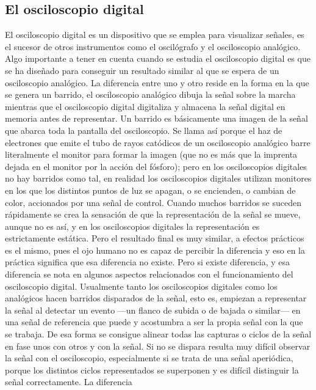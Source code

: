 \subsection{El osciloscopio digital}

El osciloscopio digital es un dispositivo que se emplea para visualizar
señales, es el sucesor de otros instrumentos como el oscilógrafo y el
osciloscopio analógico. Algo importante a tener en cuenta cuando se estudia
el osciloscopio digital es que se ha diseñado para conseguir un resultado
similar al que se espera de un osciloscopio analógico. La diferencia entre
uno y otro reside en la forma en la que se genera un barrido, el
osciloscopio analógico dibuja la señal sobre la marcha mientras que el
osciloscopio digital digitaliza y almacena la señal digital en memoria
antes de representar. Un barrido es básicamente una imagen de la señal que
abarca toda la pantalla del osciloscopio. Se llama así porque el haz de
electrones que emite el tubo de rayos catódicos de un osciloscopio
analógico barre literalmente el monitor para formar la imagen (que no es
más que la imprenta dejada en el monitor por la acción del fósforo); pero
en los osciloscopios digitales no hay barridos como tal, en realidad los
osciloscopios digitales utilizan monitores  en los que los
distintos puntos de luz se apagan, o se encienden, o cambian de color,
accionados por una señal de control. Cuando muchos barridos se suceden
rápidamente se crea la sensación de que la representación de la señal se
mueve, aunque no es así, y en los osciloscopios digitales la representación
es estrictamente estática. Pero el resultado final es muy similar, a
efectos prácticos es el mismo, pues el ojo humano no es capaz de percibir
la diferencia y eso en la práctica significa que esa diferencia no existe.
Pero si existe diferencia, y esa diferencia se nota en algunos aspectos
relacionados con el funcionamiento del osciloscopio digital. Usualmente
tanto los osciloscopios digitales como los analógicos hacen barridos
disparados de la señal, esto es, empiezan a representar la señal al
detectar un evento ---un flanco de subida o de bajada o similar--- en una
señal de referencia que puede y acostumbra a ser la propia señal con la que
se trabaja. De esa forma se consigue alinear todas las capturas o ciclos de
la señal en fase unos con otros y con la señal. Si no se dispara resulta
muy difícil observar la señal con el osciloscopio, especialmente si se
trata de una señal aperiódica, porque los distintos ciclos representados se
superponen y es difícil distinguir la señal correctamente. La diferencia
